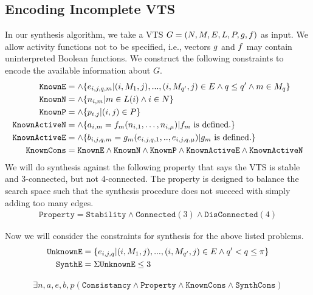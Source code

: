 \subsection{Encoding Incomplete VTS}

In our synthesis algorithm, we take a VTS $G =
(N,M,E,L,P,g,f)$ as input.
%
We allow activity functions not to be specified, i.e., vectors
$g$ and $f$ may contain uninterpreted Boolean functions.
%
We construct the following constraints to encode the available information
about $G$.
%
\begin{align*}
  \texttt{KnownE} &= \land \{e_{i,j,q,m}|(i,M_1,j),...,(i,M_{q'},j) \in E \land q \leq q' \land m \in M_q \}\\
  \texttt{KnownN} &= \land \{n_{i,m}| m \in L(i) \land i \in N \}\\
  \texttt{KnownP} &= \land \{p_{i,j}| (i,j) \in P \} \\
  \texttt{KnownActiveN} &= \land \{ a_{i,m} = f_m (n_{i,1},\dots,n_{i,\mu}) | f_m \text{ is defined.} \} \\
  \texttt{KnownActiveE} &= \land \{ b_{i,j,q,m} = g_m(e_{i,j,q,1}, .., e_{i,j,q,\mu})
                   | g_m \text{ is defined.} \} \\
  \texttt{KnownCons} & = \texttt{KnownE} \land \texttt{KnownN} \land 
                      \texttt{KnownP} \land \texttt{KnownActiveE} \land \texttt{KnownActiveN}
\end{align*}
We will do synthesis against the following property that says the VTS is stable and  3-connected,
but not 4-connected.
%
The property is designed to balance the search space such that the synthesis procedure does not
succeed with simply adding too many edges. 
%
\begin{align*}
  \texttt{Property} =  \texttt{Stability} \land \texttt{Connected}(3) \land \texttt{DisConnected}(4)
\end{align*}


Now we will consider the constraints for synthesis for the above
listed problems.
\begin{align*}
  \texttt{UnknownE} &= \{e_{i,j,q}|(i,M_1,j),...,(i,M_{q'},j) \in E \land 
                      q' < q \leq \pi \}\\
  \texttt{SynthE} &= \Sigma \texttt{UnknownE} \leq 3 \\
\end{align*}


\begin{align}
  \exists n, a, e, b, p
  ( \texttt{Consistancy}\land \texttt{Property} \land
  \texttt{KnownCons} \land \texttt{SynthCons} )
  \tag{E1}\label{eq:addedge1}
\end{align}




